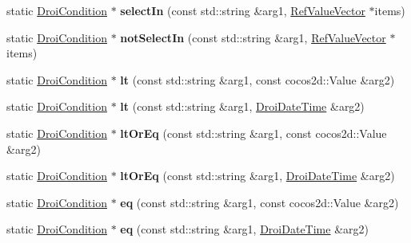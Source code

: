 \begin{DoxyCompactItemize}
static \hyperlink{class_droi_condition}{Droi\+Condition} $\ast$ {\bfseries select\+In} (const std\+::string \&arg1, \hyperlink{class_ref_value_vector}{Ref\+Value\+Vector} $\ast$items)
\item 
\mbox{\label{class_droi_condition_abbc73b551ef120d17215a004d0c2e056}} 
static \hyperlink{class_droi_condition}{Droi\+Condition} $\ast$ {\bfseries not\+Select\+In} (const std\+::string \&arg1, \hyperlink{class_ref_value_vector}{Ref\+Value\+Vector} $\ast$items)
\item 
\mbox{\label{class_droi_condition_a7b327dd8e1228d01aa2072f10ea986a7}} 
static \hyperlink{class_droi_condition}{Droi\+Condition} $\ast$ {\bfseries lt} (const std\+::string \&arg1, const cocos2d\+::\+Value \&arg2)
\item 
\mbox{\label{class_droi_condition_aa1e00aecdda43816d201485fd5045bce}} 
static \hyperlink{class_droi_condition}{Droi\+Condition} $\ast$ {\bfseries lt} (const std\+::string \&arg1, \hyperlink{class_droi_date_time}{Droi\+Date\+Time} \&arg2)
\item 
\mbox{\label{class_droi_condition_ac152cf40200fe576e6f7b3c7c6d12fed}} 
static \hyperlink{class_droi_condition}{Droi\+Condition} $\ast$ {\bfseries lt\+Or\+Eq} (const std\+::string \&arg1, const cocos2d\+::\+Value \&arg2)
\item 
\mbox{\label{class_droi_condition_a2e3841525e79c419635713db33679713}} 
static \hyperlink{class_droi_condition}{Droi\+Condition} $\ast$ {\bfseries lt\+Or\+Eq} (const std\+::string \&arg1, \hyperlink{class_droi_date_time}{Droi\+Date\+Time} \&arg2)
\item 
\mbox{\label{class_droi_condition_a26eb5b50bef3d925a9413688aecd12ae}} 
static \hyperlink{class_droi_condition}{Droi\+Condition} $\ast$ {\bfseries eq} (const std\+::string \&arg1, const cocos2d\+::\+Value \&arg2)
\item 
\mbox{\label{class_droi_condition_a35bc2c861439d0dcef0cb01869e6e526}} 
static \hyperlink{class_droi_condition}{Droi\+Condition} $\ast$ {\bfseries eq} (const std\+::string \&arg1, \hyperlink{class_droi_date_time}{Droi\+Date\+Time} \&arg2)

\end{DoxyCompactItemize}
